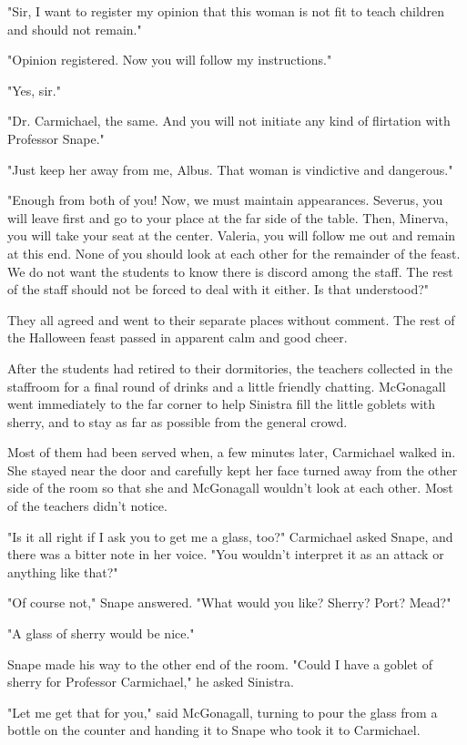 "Sir, I want to register my opinion that this woman is not fit to teach children and should not remain."

"Opinion registered. Now you will follow my instructions."

"Yes, sir."

"Dr. Carmichael, the same. And you will not initiate any kind of flirtation with Professor Snape."

"Just keep her away from me, Albus. That woman is vindictive and dangerous."

"Enough from both of you! Now, we must maintain appearances. Severus, you will leave first and go to your place at the far side of the table. Then, Minerva, you will take your seat at the center. Valeria, you will follow me out and remain at this end. None of you should look at each other for the remainder of the feast. We do not want the students to know there is discord among the staff. The rest of the staff should not be forced to deal with it either. Is that understood?"

They all agreed and went to their separate places without comment. The rest of the Halloween feast passed in apparent calm and good cheer.

After the students had retired to their dormitories, the teachers collected in the staffroom for a final round of drinks and a little friendly chatting. McGonagall went immediately to the far corner to help Sinistra fill the little goblets with sherry, and to stay as far as possible from the general crowd.

Most of them had been served when, a few minutes later, Carmichael walked in. She stayed near the door and carefully kept her face turned away from the other side of the room so that she and McGonagall wouldn't look at each other. Most of the teachers didn't notice.

"Is it all right if I ask you to get me a glass, too?" Carmichael asked Snape, and there was a bitter note in her voice. "You wouldn't interpret it as an attack or anything like that?"

"Of course not," Snape answered. "What would you like? Sherry? Port? Mead?"

"A glass of sherry would be nice."

Snape made his way to the other end of the room. "Could I have a goblet of sherry for Professor Carmichael," he asked Sinistra.

"Let me get that for you," said McGonagall, turning to pour the glass from a bottle on the counter and handing it to Snape who took it to Carmichael.

